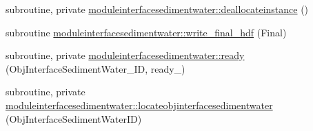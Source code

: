 \begin{DoxyCompactItemize}
\item 
subroutine, private \mbox{\hyperlink{namespacemoduleinterfacesedimentwater_a0dea9565c188c72edf29abf28839a5ac}{moduleinterfacesedimentwater\+::deallocateinstance}} ()
\item 
subroutine \mbox{\hyperlink{namespacemoduleinterfacesedimentwater_a44d390c3a6dfc918b1ff6bc5261c39ec}{moduleinterfacesedimentwater\+::write\+\_\+final\+\_\+hdf}} (Final)
\item 
subroutine, private \mbox{\hyperlink{namespacemoduleinterfacesedimentwater_af31617d2ab88d4aceb9dd0edcac94ff2}{moduleinterfacesedimentwater\+::ready}} (Obj\+Interface\+Sediment\+Water\+\_\+\+ID, ready\+\_\+)
\item 
subroutine, private \mbox{\hyperlink{namespacemoduleinterfacesedimentwater_a299f7798fddc9b92224d7bf9ec6785c0}{moduleinterfacesedimentwater\+::locateobjinterfacesedimentwater}} (Obj\+Interface\+Sediment\+Water\+ID)
\end{DoxyCompactItemize}
